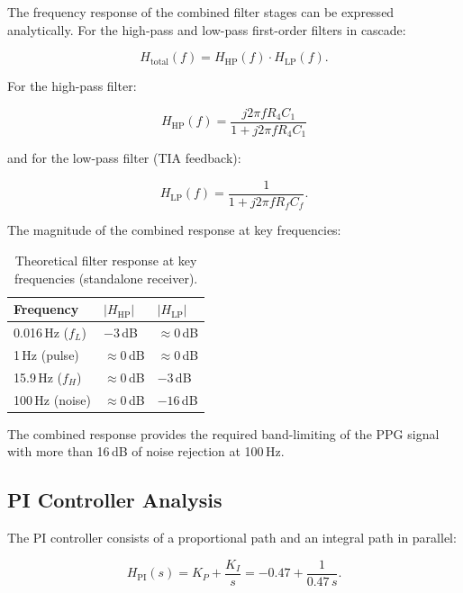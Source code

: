\documentclass[10pt]{article}
\begin{document}
The frequency response of the combined filter stages can be expressed analytically. For the high-pass and low-pass first-order filters in cascade:

\begin{equation}
H_{\mathrm{total}}(f)
=
H_{\mathrm{HP}}(f)
\cdot
H_{\mathrm{LP}}(f).
\end{equation}

For the high-pass filter:

\begin{equation}
H_{\mathrm{HP}}(f)
=
\frac{j2\pi fR_4 C_1}{1+j2\pi fR_4 C_1}
\end{equation}

and for the low-pass filter (TIA feedback):

\begin{equation}
H_{\mathrm{LP}}(f)
=
\frac{1}{1+j2\pi fR_f C_f}.
\end{equation}

The magnitude of the combined response at key frequencies:

\begin{table}[H]
\centering
\caption{Theoretical filter response at key frequencies (standalone receiver).}
\begin{tabular}{lll}
\toprule
Frequency & $|H_{\mathrm{HP}}|$ & $|H_{\mathrm{LP}}|$\\
\midrule
0.016\,Hz ($f_L$) & $-3$\,dB & $\approx 0$\,dB\\
1\,Hz (pulse) & $\approx 0$\,dB & $\approx 0$\,dB\\
15.9\,Hz ($f_H$) & $\approx 0$\,dB & $-3$\,dB\\
100\,Hz (noise) & $\approx 0$\,dB & $-16$\,dB\\
\bottomrule
\end{tabular}
\end{table}

The combined response provides the required band-limiting of the PPG signal with more than 16\,dB of noise rejection at 100\,Hz.

\subsection{PI Controller Analysis}

The PI controller consists of a proportional path and an integral path in parallel:

\begin{equation}
H_{\mathrm{PI}}(s) = K_P + \frac{K_I}{s} = -0.47 + \frac{1}{0.47\,s}.
\end{equation}
\end{document}
